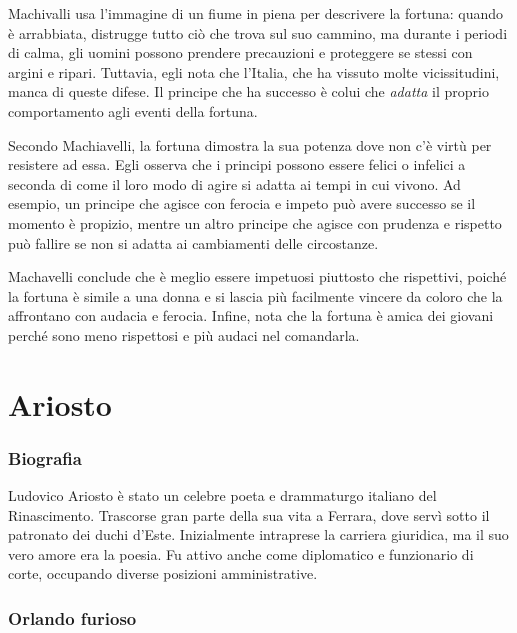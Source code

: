 \documentclass[a4paper]{article}
\begin{document}
Machivalli usa l'immagine di un fiume in piena per descrivere la fortuna: quando è arrabbiata, distrugge tutto ciò che trova sul suo cammino, ma durante i periodi di calma, gli uomini possono prendere precauzioni e proteggere se stessi con argini e ripari. Tuttavia, egli nota che l'Italia, che ha vissuto molte vicissitudini, manca di queste difese.
Il principe che ha successo è colui che \textit{adatta} il proprio comportamento agli eventi della fortuna.

Secondo Machiavelli, la fortuna dimostra la sua potenza dove non c'è virtù per resistere ad essa. Egli osserva che i principi possono essere felici o infelici a seconda di come il loro modo di agire si adatta ai tempi in cui vivono. Ad esempio, un principe che agisce con ferocia e impeto può avere successo se il momento è propizio, mentre un altro principe che agisce con prudenza e rispetto può fallire se non si adatta ai cambiamenti delle circostanze.

Machavelli conclude che è meglio essere impetuosi piuttosto che rispettivi, poiché la fortuna è simile a una donna e si lascia più facilmente vincere da coloro che la affrontano con audacia e ferocia. Infine, nota che la fortuna è amica dei giovani perché sono meno rispettosi e più audaci nel comandarla.

\pagebreak

\part{Ariosto}

\section{Biografia}

Ludovico Ariosto è stato un celebre poeta e drammaturgo italiano del Rinascimento.
Trascorse gran parte della sua vita a Ferrara, dove servì sotto il patronato
dei duchi d'Este. Inizialmente intraprese la carriera giuridica,
ma il suo vero amore era la poesia.
Fu attivo anche come diplomatico e funzionario di corte,
occupando diverse posizioni amministrative.


\section{Orlando furioso}
\end{document}
